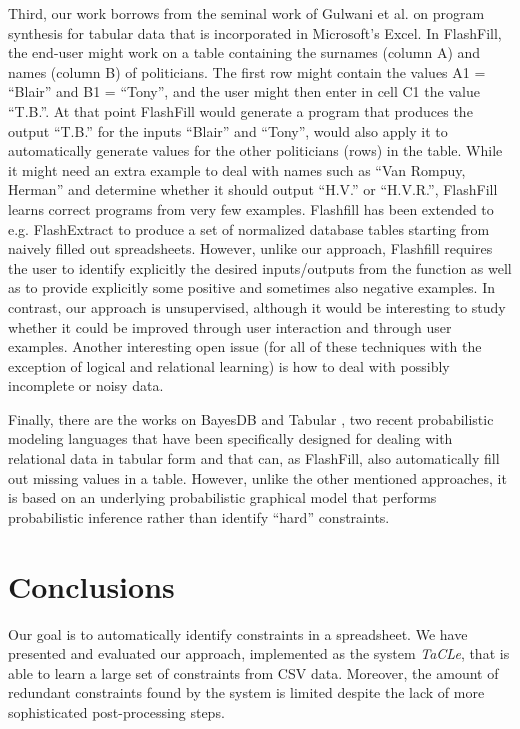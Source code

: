 \documentclass{IEEEtran}
\newcommand{\format}[1]{\textit{#1}\xspace}
\newcommand{\sname}{\format{TaCLe}}
\theoremstyle{definition}
\begin{document}
Third, our work borrows from the seminal work of Gulwani et al. \cite{flashfill} on program synthesis for tabular data that is incorporated in Microsoft’s Excel. In FlashFill, the end-user might work on a table containing the surnames (column A) and names (column B) of politicians. The first row might contain the values A1 = ``Blair'' and B1 = ``Tony'', and the user might then enter in cell C1 the value ``T.B.''. At that point FlashFill would generate a program that produces the output ``T.B.'' for the inputs ``Blair'' and ``Tony'', would also apply it to automatically generate values for the other politicians (rows) in the table. While it might need an extra example to deal with names such as ``Van Rompuy, Herman'' and determine whether it should output ``H.V.'' or ``H.V.R.'', FlashFill learns correct programs from very few examples. Flashfill has been extended to e.g. FlashExtract \cite{flashextract} to produce a set of normalized database tables starting from naively filled out spreadsheets. However, unlike our approach, Flashfill requires the user to identify explicitly the desired inputs/outputs from the function as well as to provide explicitly some positive and sometimes also negative examples.  In contrast, our approach is unsupervised, although it would be interesting to study whether it could be improved through user interaction and through user examples.  Another interesting open issue (for all of these techniques with the exception of logical and relational learning) is how to deal with possibly incomplete or noisy data.

Finally, there are the works on  BayesDB \cite{BayesDB} and Tabular \cite{tabular}, two recent probabilistic modeling languages that have been specifically designed for dealing with relational data in tabular form and that can, as FlashFill, also automatically fill out missing values in a table.  However, unlike the other mentioned approaches, it is based on an underlying probabilistic graphical model that performs probabilistic inference rather than identify “hard” constraints.

\section{Conclusions}\label{sec:conclusions}

Our goal is to automatically identify constraints in a spreadsheet.
We have presented and evaluated our approach, implemented as the system \sname, that is able to learn a large set of constraints from CSV data.
Moreover, the amount of redundant constraints found by the system is limited despite the lack of more sophisticated post-processing steps.
\end{document}
